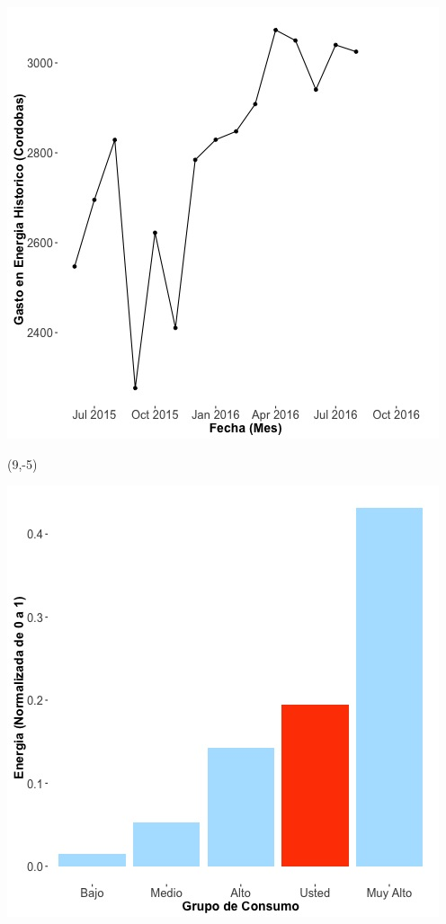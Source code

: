 \documentclass{article}\usepackage[]{graphicx}\usepackage[]{color}
\newenvironment{knitrout}{}{} %
\begin{document}
\begin{knitrout}
\color{fgcolor}
\includegraphics[scale=0.65]{figure/A17_historico_cordobas} 
\end{knitrout}

 \begin{textblock}{1}(9,-5)
\begin{minipage}{20em}
\begingroup

\endgroup
\end{minipage}
\end{textblock}


\begin{knitrout}
\color{fgcolor}
\includegraphics[scale=0.65]{figure/A17_neighbor_plot} 
\end{knitrout}
\end{document}
